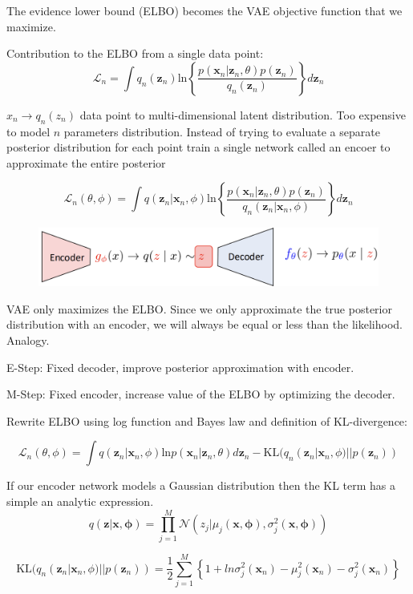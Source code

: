 The evidence lower bound (ELBO) becomes the VAE objective function that we maximize.

Contribution to the ELBO from a single data point:
\[
\mathcal{L}_n = \int q_n(\mathbf{z}_n)\text{ln}\left\{\frac{p(\mathbf{x}_n|\mathbf{z}_n,\theta)p(\mathbf{z}_n)}{q_n(\mathbf{z}_n)}\right\}d\mathbf{z}_n
\]

\( x_n \rightarrow q_n(z_n)\) data point to multi-dimensional latent distribution.
Too expensive to model \(n\) parameters distribution.
Instead of trying to evaluate a separate posterior distribution for each point train a single network called an encoer to approximate the entire posterior

\[
\mathcal{L}_n(\theta,\phi) = \int q(\mathbf{z}_n|\mathbf{x}_n,\phi) \text{ln} \left\{\frac{p(\mathbf{x}_n|\mathbf{z}_n,\theta)p(\mathbf{z}_n)}{q_n(\mathbf{z}_n|\mathbf{x}_n,\phi)}\right\}d\mathbf{z}_n
\]

\begin{figure}
    \includegraphics[width = \columnwidth]{figures/GenAI2/ELBO.png}
\end{figure}

VAE only maximizes the ELBO.
Since we only approximate the true posterior distribution with an encoder, we will always be equal or less than the likelihood.
Analogy.

E-Step: Fixed decoder, improve posterior approximation with encoder.

M-Step: Fixed encoder, increase value of the ELBO by optimizing the decoder.

Rewrite ELBO using log function and Bayes law and definition of KL-divergence:

\[
\mathcal{L}_n(\theta,\phi) = \int q(\mathbf{z}_n|\mathbf{x}_n,\phi)  \text{ln}  p(\mathbf{x}_n|\mathbf{z}_n,\theta) d\mathbf{z}_n - \text{KL}(q_n(\mathbf{z}_n|\mathbf{x}_n,\phi)||p(\mathbf{z}_n))
\]

If our encoder network models a Gaussian distribution then the KL term has a simple an analytic expression.
\[
q(\mathbf{z}|\mathbf{x},\mathbf{\phi}) = \prod_{j = 1}^{M}\mathcal{N}(z_j|\mu_j(\mathbf{x},\mathbf{\phi}),\sigma_j^2(\mathbf{x},\mathbf{\phi}))
\]

\[
\text{KL}(q_n(\mathbf{z}_n|\mathbf{x}_n,\phi)||p(\mathbf{z}_n)) = \frac{1}{2}\sum_{j=1}^{M}\left\{1+ln\sigma_j^2(\mathbf{x}_n) - \mu_j^2(\mathbf{x}_n)-\sigma_j^2(\mathbf{x}_n)\right\}
\]

